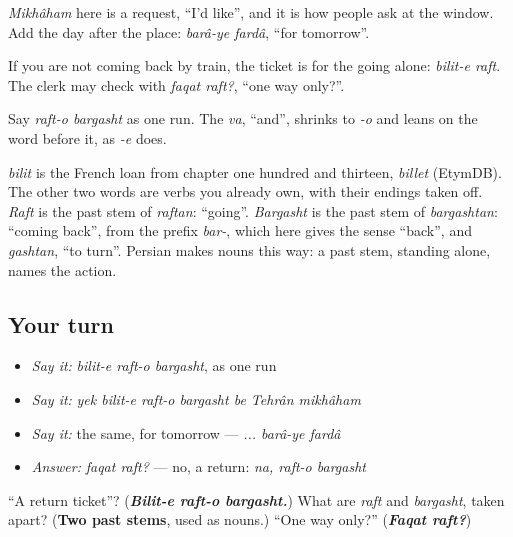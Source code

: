 \emph{Mikhâham} here is a request, \textquotedblleft{}I'd like\textquotedblright{}, and it is how people ask at the window. Add the day after the place: \emph{barâ-ye fardâ}, \textquotedblleft{}for tomorrow\textquotedblright{}.

If you are not coming back by train, the ticket is for the going alone: \emph{bilit-e raft}. The clerk may check with \emph{faqat raft?}, \textquotedblleft{}one way only?\textquotedblright{}.

Say \emph{raft-o bargasht} as one run. The \emph{va}, \textquotedblleft{}and\textquotedblright{}, shrinks to \emph{-o} and leans on the word before it, as \emph{-e} does.

\begin{cousinweb}
\emph{bilit} is the French loan from chapter one hundred and thirteen, \emph{billet} (EtymDB). The other two words are verbs you already own, with their endings taken off. \emph{Raft} is the past stem of \emph{raftan}: \textquotedblleft{}going\textquotedblright{}. \emph{Bargasht} is the past stem of \emph{bargashtan}: \textquotedblleft{}coming back\textquotedblright{}, from the prefix \emph{bar-}, which here gives the sense \textquotedblleft{}back\textquotedblright{}, and \emph{gashtan}, \textquotedblleft{}to turn\textquotedblright{}. Persian makes nouns this way: a past stem, standing alone, names the action.
\end{cousinweb}

\subsection*{Your turn}
\begin{itemize}
\raggedright
  \item \emph{Say it:} \emph{bilit-e raft-o bargasht}, as one run
  \item \emph{Say it:} \emph{yek bilit-e raft-o bargasht be Tehrân mikhâham}
  \item \emph{Say it:} the same, for tomorrow — \emph{... barâ-ye fardâ}
  \item \emph{Answer:} \emph{faqat raft?} — no, a return: \emph{na, raft-o bargasht}
\end{itemize}

\begin{tcolorbox}[breakable,colback=teal!4,colframe=teal!35!black,title={Before you move on}]
\textquotedblleft{}A return ticket\textquotedblright{}? (\emph{\textbf{Bilit-e raft-o bargasht.}}) What are \emph{raft} and \emph{bargasht}, taken apart? (\textbf{Two past stems}, used as nouns.) \textquotedblleft{}One way only?\textquotedblright{} (\emph{\textbf{Faqat raft?}})
\end{tcolorbox}
